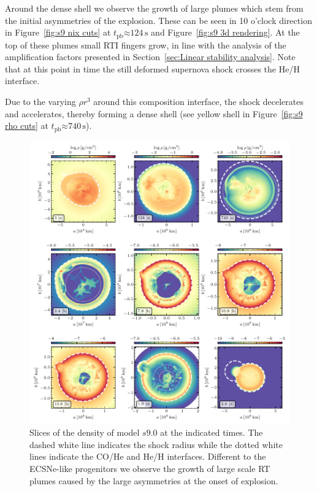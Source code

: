 \documentclass[fleqn,usenatbib]{mnras}
\newcommand{\tpb}{\ensuremath{t_{\text{pb}}}}
\newcommand{\s}{\ensuremath{\text{s}}}
\begin{document}
Around the dense shell we observe the growth of large plumes which stem from the initial 
asymmetries of the explosion. These can be seen in 10 o'clock direction in
Figure~\ref{fig:s9 nix cuts} at $\tpb\mathord{\approx} 124\,\s$ and Figure~\ref{fig:s9 3d rendering}.
At the top of these plumes small RTI fingers grow, in line with the analysis of the amplification factors presented in Section~\ref{sec:Linear stability analysis}. 
Note that at this point in time the still deformed supernova shock crosses the He/H interface.

Due to the varying $\rho r^3$ around this composition interface, the shock decelerates and accelerates, thereby forming a dense shell (see yellow shell in Figure~\ref{fig:s9 rho cuts} at $\tpb\mathord{\approx}740\,\s$). 

\begin{figure}%
\includegraphics[width=\textwidth]{pic/s9_3d_3x3_den.pdf}
    \caption{Slices of the density of model $s9.0$ at the indicated times. 
        The dashed white line indicates the shock radius while the 
        dotted white lines indicate the CO/He and He/H interfaces.
        Different to the ECSNe-like progenitors we observe the growth of large 
        scale RT plumes caused by the large asymmetries at the onset of explosion.
}
\end{figure}
\end{document}
